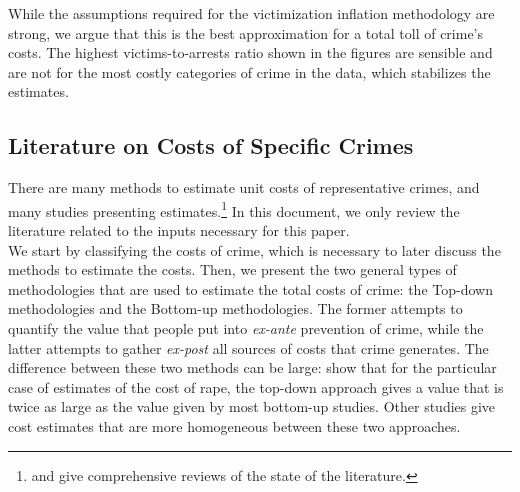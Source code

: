 \noindent While the assumptions required for the victimization inflation methodology are strong, we argue that this is the best approximation for a total toll of crime's costs. The highest victims-to-arrests ratio shown in the figures are sensible and are not for the most costly categories of crime in the data, which stabilizes the estimates. \\

\subsection{Literature on Costs of Specific Crimes}
\noindent There are many methods to estimate unit costs of representative crimes, and many studies presenting estimates.\footnote{\citet{Cohen-Bowles_2010_Estimating-Cost-Crime} and \citet{McCollister_etal_2010_DAD} give comprehensive reviews of the state of the literature.} In this document, we only review the literature related to the inputs necessary for this paper. \\

\noindent We start by classifying the costs of crime, which is necessary to later discuss the methods to estimate the costs. Then, we present the two general types of methodologies that are used to estimate the total costs of crime: the Top-down methodologies and the Bottom-up methodologies. The former attempts to quantify the value that people put into \emph{ex-ante} prevention of crime, while the latter attempts to gather \emph{ex-post} all sources of costs that crime generates. The difference between these two methods can be large: \cite{Cohen-Bowles_2010_Estimating-Cost-Crime} show that for the particular case of estimates of the cost of rape, the top-down approach gives a value that is twice as large as the value given by most bottom-up studies. Other studies give cost estimates that are more homogeneous between these two approaches.\\

